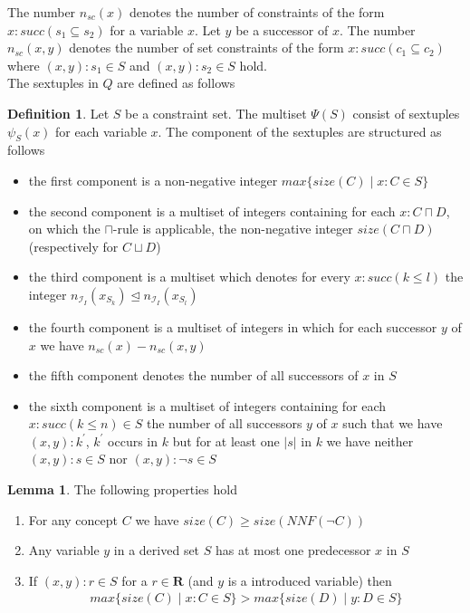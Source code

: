 \documentclass[a4paper,11pt]{scrartcl}
\theoremstyle{break}
\theoremstyle{definition}
\newtheorem{mydef}{Definition}
\newtheorem{mylem}{Lemma}
\begin{document}
The number $n_{sc}(x)$ denotes the number of constraints of the form $x:succ(s_1\subseteq s_2)$ for a variable $x$. Let $y$ be a successor of $x$. The number $n_{sc}(x,y)$ denotes the number of set constraints of the form $x:succ(c_1\subseteq c_2)$ where $(x,y):s_1\in S$ and $(x,y):s_2\in S$ hold.\\
The sextuples in $Q$ are defined as follows
\begin{mydef}
Let $S$ be a constraint set. The multiset $\Psi(S)$ consist of sextuples $\psi_S(x)$ for each variable $x$. The component of the sextuples are structured as follows
\begin{itemize}
\item the first component is a non-negative integer $max\{size(C)\mid x:C\in S\}$
\item the second component is a multiset of integers containing for each $x:C\sqcap D$, on which the $\sqcap$-rule is applicable, the non-negative integer $size(C\sqcap D)$ (respectively for $C\sqcup D$)
\item the third component is a multiset which denotes for every $x:succ(k\leq l)$ the integer $n_{\mathcal{I}_I}(x_{S_k})\unlhd n_{\mathcal{I}_I}(x_{S_l})$
\item the fourth component is a multiset of integers in which for each successor $y$ of $x$ we have $n_{sc}(x)-n_{sc}(x,y)$
\item the fifth component denotes the number of all successors of $x$ in $S$
\item the sixth component is a multiset of integers containing for each $x:succ(k\leq n)\in S$ the number of all successors $y$ of $x$ such that we have $(x,y):k^\prime$, $k^\prime$ occurs in $k$ but for at least one $|s|$ in $k$ we have neither $(x,y):s\in S$ nor $(x,y):\neg s\in S$
\end{itemize}
\end{mydef}
\begin{mylem}
The following properties hold
\begin{enumerate}
\item For any concept $C$ we have $size(C)\geq size(NNF(\neg C))$
 \item Any variable $y$ in a derived set $S$ has at most one predecessor $x$ in $S$
\item If $(x,y):r\in S$ for a $r\in\mathbf{R}$ (and $y$ is a introduced variable) then 
\begin{align*}
max\{size(C)\mid x:C\in S\}>max\{size(D)\mid y:D \in S\}
\end{align*}
\end{enumerate}
\end{mylem}
\end{document}
